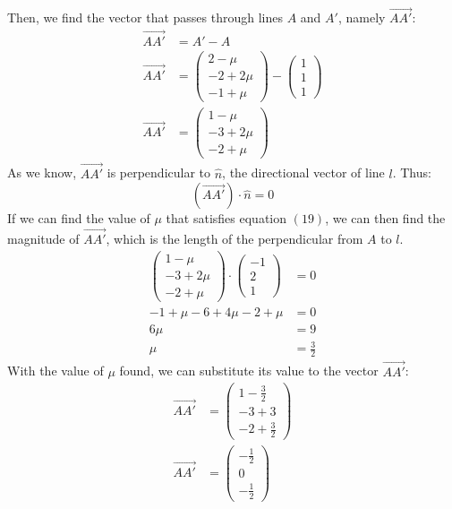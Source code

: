 \documentclass[hidelinks, a4paper, 12pt]{article}
\newcommand{\nhat}{\hat{n}}
\begin{document}
            Then, we find the vector that passes through lines $A$ and $A'$, namely $\vec{AA'}$:
            \[\begin{split}
                \vec{AA'} &= A' - A\\
                \vec{AA'} &= \begin{pmatrix} 2-\mu \\ -2+2\mu \\ -1+\mu \end{pmatrix} - \begin{pmatrix} 1 \\ 1 \\ 1 \end{pmatrix}\\
                \vec{AA'} &= \begin{pmatrix} 1-\mu \\ -3+2\mu \\ -2+\mu \end{pmatrix}
            \end{split}\]
            As we know, $\vec{AA'}$ is perpendicular to $\nhat$, the directional vector of line $l$. Thus:
            \begin{equation}
                (\vec{AA'}) \cdot \nhat = 0
            \end{equation}
            If we can find the value of $\mu$ that satisfies equation $(19)$, we can then find the magnitude of $\vec{AA'}$, which is the length of the perpendicular
            from $A$ to $l$.
            \[\begin{split}
                \begin{pmatrix} 1-\mu \\ -3+2\mu \\ -2+\mu \end{pmatrix} \cdot \begin{pmatrix} -1 \\ 2 \\ 1 \end{pmatrix} &= 0\\
                -1 + \mu - 6 + 4\mu - 2 + \mu &= 0\\
                6\mu &= 9\\
                \mu &= \frac{3}{2}
            \end{split}\]
            With the value of $\mu$ found, we can substitute its value to the vector $\vec{AA'}$:
            \[\begin{split}
                \vec{AA'} &= \begin{pmatrix} 1-\frac{3}{2} \\ -3+3 \\ -2+\frac{3}{2} \end{pmatrix}\\
                \vec{AA'} &= \begin{pmatrix} -\frac{1}{2} \\ 0 \\ -\frac{1}{2} \end{pmatrix}
            \end{split}\]
\end{document}
